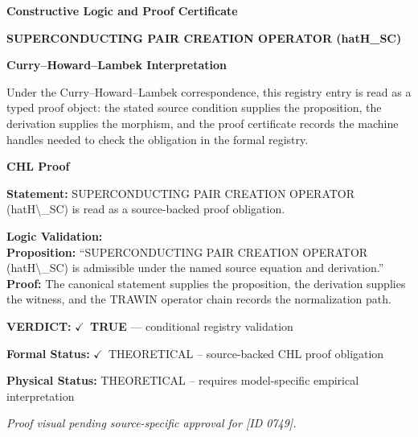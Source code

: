 \clearpage
\begingroup\tzpsupportsetup
\noindent\textbf{\fontsize{10.8pt}{12.8pt}\selectfont [ID 0749] Constructive Logic and Proof Certificate}\par
\noindent\textbf{\fontsize{10pt}{12pt}\selectfont SUPERCONDUCTING PAIR CREATION OPERATOR (hatH\_SC)}\par
\vspace{0.45em}
\begingroup
\footnotesize
\setlength{\parskip}{0.22em}
\setlength{\parindent}{0pt}
\noindent\textbf{Curry--Howard--Lambek Interpretation}\par
Under the Curry--Howard--Lambek correspondence, this registry entry is read as a typed proof
object: the stated source condition supplies the proposition, the derivation supplies the
morphism, and the proof certificate records the machine handles needed to check the obligation
in the formal registry.

\vspace{0.45em}
\noindent\textbf{CHL Proof}\par
\textbf{Statement:} SUPERCONDUCTING PAIR CREATION OPERATOR (hatH\textbackslash{}\_SC) is read as a source-backed proof obligation.

\textbf{Logic Validation:}\\
\textbf{Proposition:} ``SUPERCONDUCTING PAIR CREATION OPERATOR (hatH\textbackslash{}\_SC) is admissible under the named source equation and derivation.''\\
\textbf{Proof:} The canonical statement supplies the proposition, the derivation supplies the witness, and the TRAWIN operator chain records the normalization path.

\textbf{VERDICT:} \ensuremath{\checkmark}\ \textbf{TRUE} --- conditional registry validation

\textbf{Formal Status:} \ensuremath{\checkmark}\ THEORETICAL -- source-backed CHL proof obligation

\textbf{Physical Status:} THEORETICAL -- requires model-specific empirical interpretation
\par\vspace{0.45em}
\par
\vfill
\begingroup\footnotesize\itshape
Proof visual pending source-specific approval for [ID 0749].
\par\endgroup
\vfill
\endgroup
\endgroup
